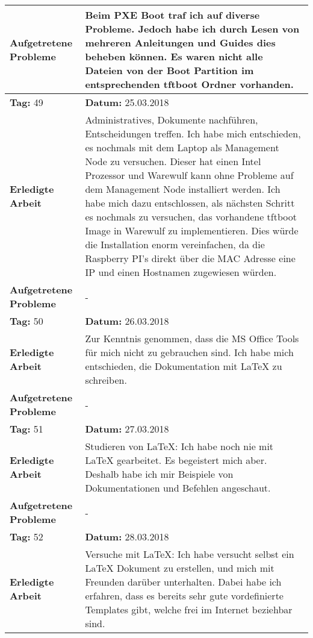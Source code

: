 \begin{longtable}{|p{5cm}|p{5cm}p{6cm}|}
\textbf{Aufgetretene Probleme} & \multicolumn{2}{p{11cm}|}{Beim PXE Boot traf ich auf diverse Probleme. Jedoch habe ich durch Lesen von mehreren Anleitungen und Guides dies beheben können. Es waren nicht alle Dateien von der Boot Partition im entsprechenden tftboot Ordner vorhanden.} \\ \hline
\rowcolor{heading}\textbf{Tag:} 49 & \textbf{Datum:} 25.03.2018 & \\ \hline
\textbf{Erledigte Arbeit} & \multicolumn{2}{p{11cm}|}{Administratives, Dokumente nachführen, Entscheidungen treffen. Ich habe mich entschieden, es nochmals mit dem Laptop als Management Node zu versuchen. Dieser hat einen Intel Prozessor und Warewulf kann ohne Probleme auf dem Management Node installiert werden. Ich habe mich dazu entschlossen, als nächsten Schritt es nochmals zu versuchen, das vorhandene tftboot Image in Warewulf zu implementieren. Dies würde die Installation enorm vereinfachen, da die Raspberry PI's direkt über die MAC Adresse eine IP und einen Hostnamen zugewiesen würden.} \\ \hline
\textbf{Aufgetretene Probleme} & \multicolumn{2}{p{11cm}|}{-} \\ \hline
\rowcolor{heading}\textbf{Tag:} 50 & \textbf{Datum:} 26.03.2018 & \\ \hline
\textbf{Erledigte Arbeit} & \multicolumn{2}{p{11cm}|}{Zur Kenntnis genommen, dass die MS Office Tools für mich nicht zu gebrauchen sind. Ich habe mich entschieden, die Dokumentation mit LaTeX zu schreiben.} \\ \hline
\textbf{Aufgetretene Probleme} & \multicolumn{2}{p{11cm}|}{-} \\ \hline
\rowcolor{heading}\textbf{Tag:} 51 & \textbf{Datum:} 27.03.2018 & \\ \hline
\textbf{Erledigte Arbeit} & \multicolumn{2}{p{11cm}|}{Studieren von LaTeX: Ich habe noch nie mit LaTeX gearbeitet. Es begeistert mich aber. Deshalb habe ich mir Beispiele von Dokumentationen und Befehlen angeschaut.} \\ \hline
\textbf{Aufgetretene Probleme} & \multicolumn{2}{p{11cm}|}{-} \\ \hline
\rowcolor{heading}\textbf{Tag:} 52 & \textbf{Datum:} 28.03.2018 & \\ \hline
\textbf{Erledigte Arbeit} & \multicolumn{2}{p{11cm}|}{Versuche mit LaTeX: Ich habe versucht selbst ein LaTeX Dokument zu erstellen, und mich mit Freunden darüber unterhalten. Dabei habe ich erfahren, dass es bereits sehr gute vordefinierte Templates gibt, welche frei im Internet beziehbar sind.} \\ \hline

\end{longtable}
